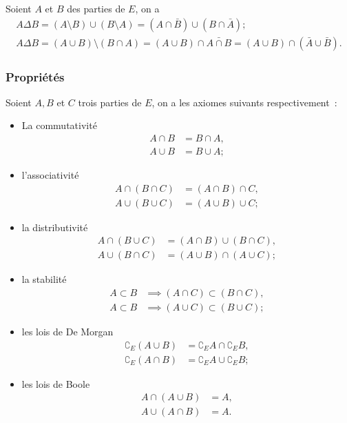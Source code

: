 \begin{prop}
    Soient \(A\) et \(B\) des parties de \(E\), on a 
    \begin{align}
        A \Delta B = (A\setminus B) \cup (B \setminus A) = (A \cap \bar{B}) \cup 
        (B \cap \bar{A});\\
        A \Delta B =(A \cup B) \setminus (B \cap A) = (A \cup B) \cap \bar{A 
        \cap B} =(A \cup B) \cap (\bar{A} \cup \bar{B}).
    \end{align}
\end{prop}

\subsubsection{Propriétés}
\label{chap3-subsubsec:prop}

\begin{axiome}
    Soient \(A, B\) et \(C\) trois parties de \(E\), on a les axiomes suivants 
    respectivement~:
    \begin{itemize}
        \item La commutativité
            \begin{align}
                A \cap B &= B \cap A, \\
                A \cup B &= B \cup A;
            \end{align}
        \item l'associativité
            \begin{align}
                A \cap (B \cap C) &= (A \cap B) \cap C, \\ 
                A \cup (B \cup C) &= (A \cup B) \cup C;
            \end{align}
        \item la distributivité
            \begin{align}
                A \cap (B \cup C) &= (A \cap B) \cup (B \cap C), \\ 
                A \cup (B \cap C) &= (A \cup B) \cap (A \cup C);
            \end{align}
        \item la stabilité
            \begin{align}
                A \subset B &\implies (A \cap C) \subset (B \cap C), \\ 
                A \subset B &\implies (A \cup C) \subset (B \cup C);
            \end{align}
        \item les lois de De Morgan
            \begin{align}
                \complement_E (A \cup B) &= \complement_E A \cap \complement_E B, \\ 
                \complement_E (A \cap B) &= \complement_E A \cup \complement_E B;
            \end{align}
        \item les lois de Boole
            \begin{align}
                A \cap (A \cup B) &= A, \\ 
                A \cup (A \cap B) &= A.
            \end{align}
    \end{itemize}
\end{axiome}

